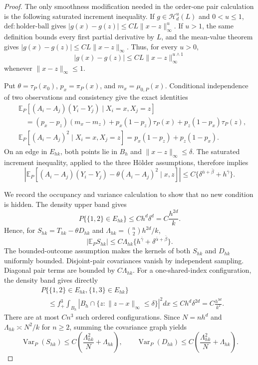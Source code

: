 \documentclass{article}
\begin{document}
\begin{proof}
The only smoothness modification needed in the order-one pair calculation is the following saturated increment inequality.  If \(g\in\mathcal H_d^u(L)\) and \(0<u\leq1\), \(\mathrm{def:holder\mbox{-}ball}\) gives \(|g(x)-g(z)|\leq C L\|x-z\|_\infty^u\).  If \(u>1\), the same definition bounds every first partial derivative by \(L\), and the mean-value theorem gives \(|g(x)-g(z)|\leq C L\|x-z\|_\infty\).  Thus, for every \(u>0\),
\[
 |g(x)-g(z)|\leq CL\|x-z\|_\infty^{u\wedge1}
\]
whenever \(\|x-z\|_\infty\leq1\).

Put \(\theta=\tau_P(x_0)\), \(p_x=\pi_P(x)\), and \(m_x=\mu_{0,P}(x)\).  Conditional independence of two observations and consistency give the exact identities
\[
 \begin{aligned}
 &\mathbb E_P[(A_i-A_j)(Y_i-Y_j)\mid X_i=x,X_j=z]\\
 &\quad=(p_x-p_z)(m_x-m_z)+p_x(1-p_z)\tau_P(x)+p_z(1-p_x)\tau_P(z),\\
 &\mathbb E_P[(A_i-A_j)^2\mid X_i=x,X_j=z]
 =p_x(1-p_z)+p_z(1-p_x).
 \end{aligned}
\]
On an edge in \(E_{hk}\), both points lie in \(B_h\) and \(\|x-z\|_\infty\leq\delta\).  The saturated increment inequality, applied to the three H\"older assumptions, therefore implies
\[
 \left|\mathbb E_P\left[(A_i-A_j)(Y_i-Y_j)-\theta(A_i-A_j)^2\mid x,z\right]\right|
 \leq C\{\delta^{\bar\alpha+\bar\beta}+h^{\bar\gamma}\}.
\]

We record the occupancy and variance calculation to show that no new condition is hidden.  The density upper band gives
\[
 P\{\{1,2\}\in E_{hk}\}\leq C h^d\delta^d=C\frac{h^{2d}}{k}.
\]
Hence, for \(S_{hk}=T_{hk}-\theta D_{hk}\) and \(\Lambda_{hk}=\binom n2h^{2d}/k\),
\[
 |\mathbb E_PS_{hk}|\leq C\Lambda_{hk}
 \{h^{\bar\gamma}+\delta^{\bar\alpha+\bar\beta}\}.
\]
The bounded-outcome assumption makes the kernels of both \(S_{hk}\) and \(D_{hk}\) uniformly bounded.  Disjoint-pair covariances vanish by independent sampling.  Diagonal pair terms are bounded by \(C\Lambda_{hk}\).  For a one-shared-index configuration, the density band gives directly
\[
 \begin{aligned}
 &P\{\{1,2\}\in E_{hk},\{1,3\}\in E_{hk}\}\\
 &\quad\leq f_+^3\int_{B_h}
 \left|B_h\cap\{z:\|z-x\|_\infty\leq\delta\}\right|^2dx
 \leq C h^d\delta^{2d}=C\frac{h^{3d}}{k^2}.
 \end{aligned}
\]
There are at most \(Cn^3\) such ordered configurations.  Since \(N=nh^d\) and \(\Lambda_{hk}\asymp N^2/k\) for \(n\geq2\), summing the covariance graph yields
\[
 \operatorname{Var}_P(S_{hk})\leq C\left(\frac{\Lambda_{hk}^2}{N}+\Lambda_{hk}\right),
 \qquad
 \operatorname{Var}_P(D_{hk})\leq C\left(\frac{\Lambda_{hk}^2}{N}+\Lambda_{hk}\right).
\]


\end{proof}
\end{document}
